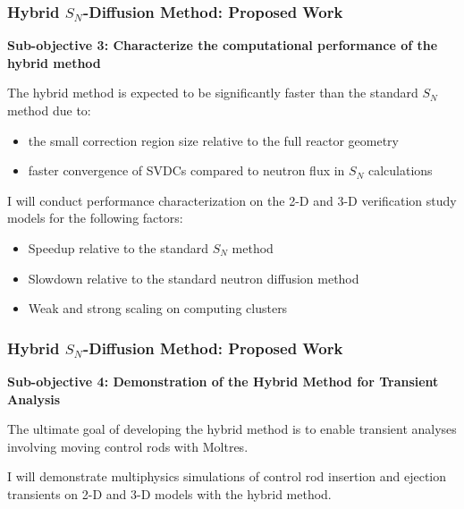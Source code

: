 \begin{frame}
  \frametitle{Hybrid $S_N$-Diffusion Method: Proposed Work}
  \textbf{Sub-objective 3: Characterize the computational performance of the hybrid method}
  \vspace{.2cm}

  The hybrid method is expected to be significantly faster than the standard $S_N$ method due to:
  \begin{itemize}
    \item the small correction region size relative to the full reactor geometry
    \item faster convergence of SVDCs compared to neutron flux in $S_N$ calculations
  \end{itemize}
  I will conduct performance characterization on the 2-D and 3-D verification study models for the
  following factors:
  \begin{itemize}
    \item Speedup relative to the standard $S_N$ method
    \item Slowdown relative to the standard neutron diffusion method
    \item Weak and strong scaling on computing clusters
  \end{itemize}
\end{frame}

\begin{frame}
  \frametitle{Hybrid $S_N$-Diffusion Method: Proposed Work}
  \textbf{Sub-objective 4: Demonstration of the Hybrid Method for Transient Analysis}
  \vspace{.2cm}

  The ultimate goal of developing the hybrid method is to enable transient analyses involving
  moving control rods with Moltres.
  \vspace{.2cm}

  I will demonstrate multiphysics simulations of control rod insertion and ejection transients
  on 2-D and 3-D models with the hybrid method.
\end{frame}
